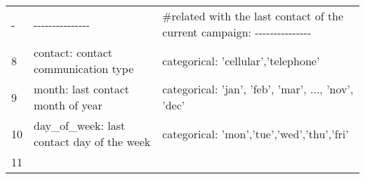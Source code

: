 \documentclass[11pt]{article}
\begin{document}
\begin{longtable}[]{@{}lll@{}}
\begin{minipage}[t]{0.01\columnwidth}\raggedright\strut
-\strut
\end{minipage} & \begin{minipage}[t]{0.12\columnwidth}\raggedright\strut
-\/-\/-\/-\/-\/-\/-\/-\/-\/-\/-\/-\/-\/-\/-\strut
\end{minipage} & \begin{minipage}[t]{0.78\columnwidth}\raggedright\strut
\#related with the last contact of the current campaign:
-\/-\/-\/-\/-\/-\/-\/-\/-\/-\/-\/-\/-\/-\/-\strut
\end{minipage}\tabularnewline
\begin{minipage}[t]{0.01\columnwidth}\raggedright\strut
8\strut
\end{minipage} & \begin{minipage}[t]{0.12\columnwidth}\raggedright\strut
contact: contact communication type\strut
\end{minipage} & \begin{minipage}[t]{0.78\columnwidth}\raggedright\strut
categorical: 'cellular','telephone'\strut
\end{minipage}\tabularnewline
\begin{minipage}[t]{0.01\columnwidth}\raggedright\strut
9\strut
\end{minipage} & \begin{minipage}[t]{0.12\columnwidth}\raggedright\strut
month: last contact month of year\strut
\end{minipage} & \begin{minipage}[t]{0.78\columnwidth}\raggedright\strut
categorical: 'jan', 'feb', 'mar', ..., 'nov', 'dec'\strut
\end{minipage}\tabularnewline
\begin{minipage}[t]{0.01\columnwidth}\raggedright\strut
10\strut
\end{minipage} & \begin{minipage}[t]{0.12\columnwidth}\raggedright\strut
day\_of\_week: last contact day of the week\strut
\end{minipage} & \begin{minipage}[t]{0.78\columnwidth}\raggedright\strut
categorical: 'mon','tue','wed','thu','fri'\strut
\end{minipage}\tabularnewline
\begin{minipage}[t]{0.01\columnwidth}\raggedright\strut
11\strut
\end{minipage} & \begin{minipage}[t]{0.12\columnwidth}\raggedright\strut

\end{minipage}
\end{longtable}
\end{document}
